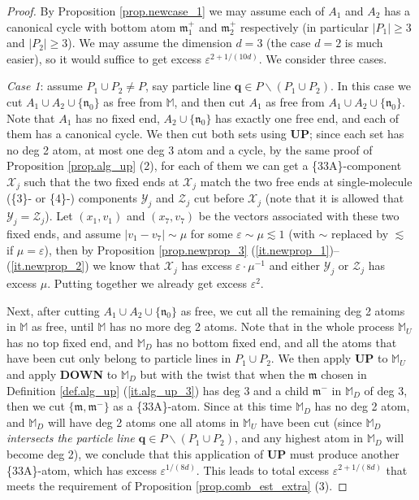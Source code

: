 \documentclass[10pt, reqno]{amsart}
\newcommand{\Mb}{\mathbb M}
\newcommand{\Xc}{\mathcal X}
\newcommand{\Yc}{\mathcal Y}
\newcommand{\Zc}{\mathcal Z}
\newcommand{\mf}{\mathfrak m}
\newcommand{\nf}{\mathfrak n}
\theoremstyle{definition}
\theoremstyle{remark}
\numberwithin{equation}{section}
\begin{document}
\begin{proof} By Proposition \ref{prop.newcase_1} we may assume each of $A_1$ and $A_2$ has a canonical cycle with bottom atom $\mf_1^+$ and $\mf_2^+$ respectively (in particular $|P_1|\geq 3$ and $|P_2|\geq 3$). We may assume the dimension $d=3$ (the case $d=2$ is much easier), so it would suffice to get excess $\varepsilon^{2+1/(10d)}$. We consider three cases.

\emph{Case 1}: assume $P_1\cup P_2\neq P$, say particle line $\boldsymbol{q}\in P\backslash (P_1\cup P_2)$. In this case we cut $A_1\cup A_2\cup\{\nf_0\}$ as free from $\Mb$, and then cut $A_1$ as free from $A_1\cup A_2\cup\{\nf_0\}$. Note that $A_1$ has no fixed end, $A_2\cup\{\nf_0\}$ has exactly one free end, and each of them has a canonical cycle. We then cut both sets using \textbf{UP}; since each set has no deg 2 atom, at most one deg 3 atom and a cycle, by the same proof of Proposition \ref{prop.alg_up} (2), for each of them we can get a \{33A\}-component $\Xc_j$ such that the two fixed ends at $\Xc_j$ match the two free ends at single-molecule (\{3\}- or \{4\}-) components $\Yc_j$ and $\Zc_j$ cut before $\Xc_j$ (note that it is allowed that $\Yc_j=\Zc_j$). Let $(x_1,v_1)$ and $(x_7,v_7)$ be the vectors associated with these two fixed ends, and assume $|v_1-v_7|\sim\mu$ for some $\varepsilon\sim\mu\lesssim 1$ (with $\sim$ replaced by $\lesssim$ if $\mu=\varepsilon$), then by Proposition \ref{prop.newprop_3} (\ref{it.newprop_1})--(\ref{it.newprop_2}) we know that $\Xc_j$ has excess $\varepsilon\cdot\mu^{-1}$ and either $\Yc_j$ or $\Zc_j$ has excess $\mu$. Putting together we already get excess $\varepsilon^2$.

Next, after cutting $A_1\cup A_2\cup\{\nf_0\}$ as free, we cut all the remaining deg 2 atoms in $\Mb$ as free, until $\Mb$ has no more deg 2 atoms. Note that in the whole process $\Mb_U$ has no top fixed end, and $\Mb_D$ has no bottom fixed end, and all the atoms that have been cut only belong to particle lines in $P_1\cup P_2$. We then apply \textbf{UP} to $\Mb_U$ and apply \textbf{DOWN} to $\Mb_D$ but with the twist that when the $\mf$ chosen in Definition \ref{def.alg_up} (\ref{it.alg_up_3}) has deg 3 and a child $\mf^-$ in $\Mb_D$ of deg 3, then we cut $\{\mf,\mf^-\}$ as a \{33A\}-atom. Since at this time $\Mb_D$ has no deg 2 atom, and $\Mb_D$ will have deg 2 atoms one all atoms in $\Mb_U$ have been cut (since $\Mb_D$ \emph{intersects the particle line $\boldsymbol{q}\in P\backslash (P_1\cup P_2)$}, and any highest atom in $\Mb_D$ will become deg 2), we conclude that this application of \textbf{UP} must produce another \{33A\}-atom, which has excess $\varepsilon^{1/(8d)}$. This leads to total excess $\varepsilon^{2+1/(8d)}$ that meets the requirement of Proposition \ref{prop.comb_est_extra} (3).


\end{proof}
\end{document}
